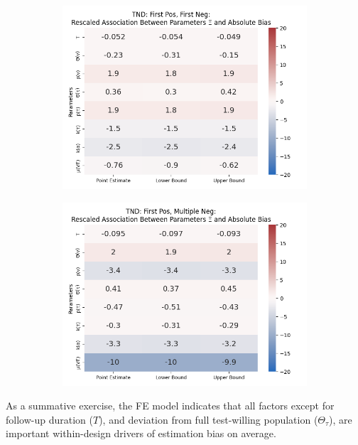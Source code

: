 \documentclass[12pt]{article}
\begin{document}
\begin{figure}[H]
	\begin{subfigure}[t]{0.23\linewidth}
		\centering
		\caption{}
		\includegraphics[scale=0.25]{VEMethod_Drivers1b_FEest_Realistic2_Li_MSpec_Heatmap9.png}
	\end{subfigure}
	\begin{subfigure}[t]{0.23\linewidth}
		\centering
		\caption{}
		\includegraphics[scale=0.25]{VEMethod_Drivers1b_FEest_Realistic2_Li_MSpec_Heatmap10.png}
	\end{subfigure}
\end{figure}

As a summative exercise, the FE model indicates that all factors except for follow-up duration ($T$), and deviation from full test-willing population ($\Theta_{\tau}$), are important within-design drivers of estimation bias on average. 
\end{document}
